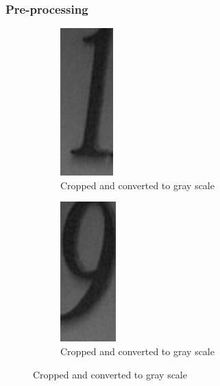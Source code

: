 \documentclass[11.5pt,aspectratio=1610,xcolor={usenames,dvipsnames,table}]{beamer}
\begin{document}
\begin{frame}
\frametitle{Pre-processing}

\begin{figure}[!h]
\begin{subfigure}{0.25\textwidth}
\includegraphics[width=0.25 \textwidth]{images/cropped_1.png}

\caption{Cropped and converted to gray scale}
\end{subfigure}
\begin{subfigure}{0.28\textwidth}
\includegraphics[width=0.25 \textwidth]{images/cropped_9.png}
\caption{Cropped and converted to gray scale}
\end{subfigure}


\end{figure}
\end{frame}
\end{document}

